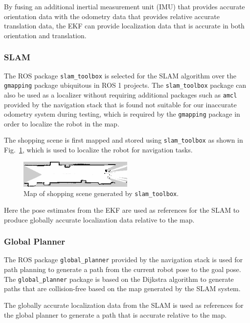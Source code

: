 \documentclass[conference]{IEEEtran}
\begin{document}
By fusing an additional inertial measurement unit (IMU) that provides accurate orientation data with the odometry data that provides relative accurate translation data, the EKF can provide localization data that is accurate in both orientation and translation.

\subsubsection{SLAM}

The ROS package \verb|slam_toolbox| \cite{slam_toolbox} is selected for the SLAM algorithm over the \verb|gmapping| \cite{gmapping} package ubiquitous in ROS 1 projects. The \verb|slam_toolbox| package can also be used as a localizer without requiring additional packages such as \verb|amcl| provided by the navigation stack that is found not suitable for our inaccurate odometry system during testing, which is required by the \verb|gmapping| package in order to localize the robot in the map.

The shopping scene is first mapped and stored using \verb|slam_toolbox| as shown in Fig.~\ref{fig_map}, which is used to localize the robot for navigation tasks.

\begin{figure}[htbp]
    \centerline{\includegraphics[width=0.5\textwidth]{figures/map.png}}
    \caption{Map of shopping scene generated by \texttt{slam\_toolbox}.}
    \label{fig_map}
\end{figure}

Here the pose estimates from the EKF are used as references for the SLAM to produce globally accurate localization data relative to the map.

\subsubsection{Global Planner}

The ROS package \verb|global_planner| provided by the navigation stack is used for path planning to generate a path from the current robot pose to the goal pose. The \verb|global_planner| package is based on the Dijkstra algorithm to generate paths that are collision-free based on the map generated by the SLAM system.

The globally accurate localization data from the SLAM is used as references for the global planner to generate a path that is accurate relative to the map.
\end{document}
